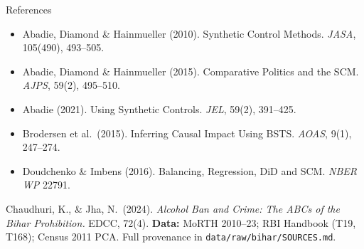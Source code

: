 \documentclass[aspectratio=169,11pt]{beamer}
\newcommand{\toptight}{\vspace{-0.15cm}}
\begin{document}
\begin{frame}{References}
  \toptight
  \vspace{0.15cm}
  \begin{tcolorbox}[navybox,title={\faBookOpen\enspace Methodology}]
    \scriptsize\setlength\itemsep{0pt}
    \begin{itemize}
      \item Abadie, Diamond \& Hainmueller (2010). Synthetic Control Methods.
            \emph{JASA}, 105(490), 493--505.
      \item Abadie, Diamond \& Hainmueller (2015). Comparative Politics and
            the SCM. \emph{AJPS}, 59(2), 495--510.
      \item Abadie (2021). Using Synthetic Controls. \emph{JEL}, 59(2), 391--425.
      \item Brodersen et al.\ (2015). Inferring Causal Impact Using BSTS.
            \emph{AOAS}, 9(1), 247--274.
      \item Doudchenko \& Imbens (2016). Balancing, Regression, DiD and SCM.
            \emph{NBER WP} 22791.
    \end{itemize}
  \end{tcolorbox}

  \vspace{0.10cm}
  \begin{tcolorbox}[navybox,title={\faBookOpen\enspace Application \& Data}]
    \scriptsize
    Chaudhuri, K., \& Jha, N.\ (2024). \emph{Alcohol Ban and Crime: The ABCs
    of the Bihar Prohibition.} EDCC, 72(4).
    \;\textbf{Data:} MoRTH 2010--23; RBI Handbook (T19, T168); Census 2011 PCA.
    Full provenance in \texttt{data/raw/bihar/SOURCES.md}.
  \end{tcolorbox}
\end{frame}

\end{document}
